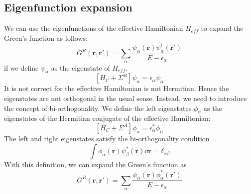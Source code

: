 \documentclass[11pt,a4paper]{book}
\theoremstyle{plain}
\theoremstyle{definition}
\theoremstyle{remark}
\renewcommand{\vec}[1]{\boldsymbol{#1}}
\begin{document}
\subsection{Eigenfunction expansion}
We can use the eigenfunctions of the effective Hamiltonian $H_{eff}$ to expand the Green's function as follows:
\begin{equation}
    G^R(\vec{r}, \vec{r}') = \sum_\alpha \frac{\psi_\alpha(\vec{r}) \psi_\alpha^\dagger(\vec{r}')}{E - \epsilon_\alpha}
\end{equation}
if we define $\psi_\alpha$ as the eigenstate of $H_{eff}$.
\begin{equation}
    \left[ H_C + \Sigma^R \right] \psi_\alpha = \epsilon_\alpha \psi_\alpha
\end{equation}
It is not correct for the effective Hamiltonian is not Hermitian. Hence the eigenstates are not orthogonal in the usual sense. Instead, we need to introduce the concept of bi-orthogonality. We define the left eigenstates $\phi_\alpha$ as the eigenstates of the Hermitian conjugate of the effective Hamiltonian:
\begin{equation}
    \left[ H_C + \Sigma^A \right] \phi_\alpha = \epsilon_\alpha^* \phi_\alpha
\end{equation}
The left and right eigenstates satisfy the bi-orthogonality condition
\begin{equation}
    \int \phi_\alpha(\vec{r}) \psi_\beta^*(\vec{r}) \dd \vec{r} = \delta_{\alpha \beta}
\end{equation}
With this definition, we can expand the Green's function as
\begin{equation}
    G^R(\vec{r}, \vec{r}') = \sum_\alpha \frac{\psi_\alpha(\vec{r}) \phi_\alpha^*(\vec{r}')}{E - \epsilon_\alpha}
\end{equation}
\end{document}
